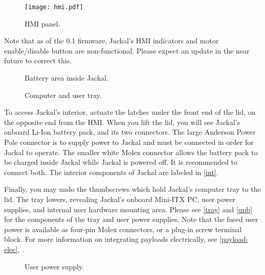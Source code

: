 \documentclass[]{clearpath-latex/clearpath-manual}
\begin{document}

\begin{figure}[ht]
  \centering
  \texttt{[image: hmi.pdf]}
  \caption{HMI panel.}
  \label{hmi}
\end{figure}

\begin{warning}
Note that as of the 0.1 firmware, Jackal's HMI indicators and motor enable/disable button are
non-functional. Please expect an update in the near future to correct this.
\end{warning}

\begin{figure}[pt]
  \centering
  \def\svgwidth{12cm}
  
  \caption{Battery area inside Jackal.}
  \label{int}
\end{figure}

\begin{figure}[pb]
  \centering
  \def\svgwidth{14cm}
  
  \caption{Computer and user tray.}
  \label{tray}
\end{figure}

To access Jackal's interior, actuate the latches under the front end of the lid, on the opposite end from
the HMI. When you lift the lid, you will see Jackal's onboard Li-Ion battery pack, and its two connectors.
The large Anderson Power Pole connector is to supply power to Jackal and must be connected in order for
Jackal to operate. The smaller white Molex connector allows the battery pack to be charged inside Jackal 
while Jackal is powered off. It is recommended to connect both. The interior components of Jackal are
labeled in \autoref{int}.

Finally, you may undo the thumbscrews which hold Jackal's computer tray to the lid. The tray lowers,
revealing Jackal's onboard Mini-ITX PC, user power supplies, and internal user hardware mounting area.
Please see \autoref{tray} and \autoref{upb} for the components of the tray and user power supplies.
Note that the fused user power is available as four-pin Molex connectors, or a plug-in screw terminal
block. For more information on integrating payloads electrically, see \autoref{payload-elec},
.

\begin{figure}[hb]
  \centering
  \def\svgwidth{15cm}
  
  \caption{User power supply.}
  \label{upb}
\end{figure}
\end{document}
